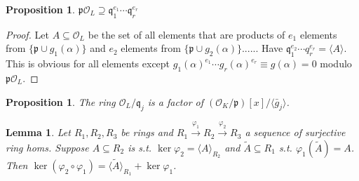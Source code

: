 \documentclass{article}
\theoremstyle{definition}
\theoremstyle{remark}
\theoremstyle{plain}
\newtheorem{lem}[defn]{Lemma}
\newtheorem{prop}[defn]{Proposition}
\begin{document}
\begin{prop}
    $\mathfrak p\mathcal O_L\supseteq \mathfrak q_1^{e_1}\cdots \mathfrak q_r^{e_r}$
\end{prop}
\begin{proof}
    Let $A\subseteq \mathcal O_L$ be the set of all elements that are products of $e_1$ elements from $\{\mathfrak p\cup g_1(\alpha)\}$ and $e_2 $ elements from $\{\mathfrak p\cup g_2(\alpha)\}$...... Have $\mathfrak q_1^{e_2}\cdots q_r^{e_r}=\langle A\rangle$. This is obvious for all elements except $g_1(\alpha)^{e_1}\cdots g_r(\alpha)^{e_r}\equiv g(\alpha)=0$ modulo $\mathfrak p\mathcal O_L$. 
\end{proof}
\begin{prop}
    The ring $\mathcal O_L/\mathfrak q_j$ is a factor of $(\mathcal O_K/\mathfrak p)[x]/\langle \bar g_j\rangle$.
\end{prop}
\begin{lem}
    Let $R_1,R_2,R_3$ be rings and $R_1\overset{\varphi_1}{\to}R_2\overset{\varphi_2}{\to}R_3$ a sequence of surjective ring homs. Suppose $A\subseteq R_2$ is s.t. $\ker\varphi_2=\langle A\rangle_{R_2}$ and $\tilde A\subseteq R_1$ s.t. $\varphi_1(\tilde A)=A$. Then $\ker(\varphi_2\circ\varphi_1)=\langle\tilde A\rangle_{R_1}+\ker\varphi_1$.
\end{lem}
\end{document}
